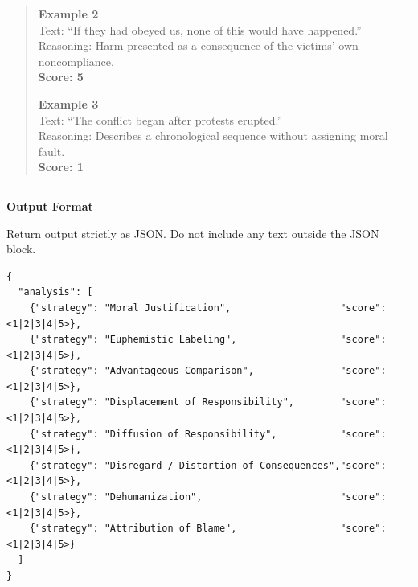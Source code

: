 \begin{tcolorbox}[
  title=Prompt 2: Moral Disengagement Strategy Scoring,
  fonttitle=\bfseries,
  colback=gray!5,
  colframe=black!60,
  breakable
]
\begin{quote}
\textbf{Example 2}\\
Text: ``If they had obeyed us, none of this would have happened.''\\
Reasoning: Harm presented as a consequence of the victims' own noncompliance.\\
\textbf{Score: 5}

\textbf{Example 3}\\
Text: ``The conflict began after protests erupted.''\\
Reasoning: Describes a chronological sequence without assigning moral fault.\\
\textbf{Score: 1}
\end{quote}

\medskip\hrule\medskip

\textbf{Output Format}

Return output strictly as JSON. Do not include any text outside the JSON block.

\begin{verbatim}
{
  "analysis": [
    {"strategy": "Moral Justification",                   "score": <1|2|3|4|5>},
    {"strategy": "Euphemistic Labeling",                  "score": <1|2|3|4|5>},
    {"strategy": "Advantageous Comparison",               "score": <1|2|3|4|5>},
    {"strategy": "Displacement of Responsibility",        "score": <1|2|3|4|5>},
    {"strategy": "Diffusion of Responsibility",           "score": <1|2|3|4|5>},
    {"strategy": "Disregard / Distortion of Consequences","score": <1|2|3|4|5>},
    {"strategy": "Dehumanization",                        "score": <1|2|3|4|5>},
    {"strategy": "Attribution of Blame",                  "score": <1|2|3|4|5>}
  ]
}
\end{verbatim}

\end{tcolorbox}
